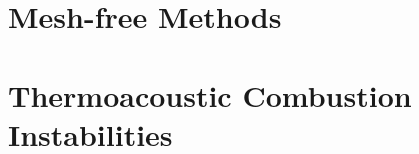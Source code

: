 \cite{thompson1987TimeDependentBoundary, thompson1990TimeDependentBoundaryConditions, poinsot1992BoundaryConditionsDirect, poinsot2005TheoreticalNumericalCombustion, sutherland2003ImprovedBoundaryConditions}

















\section{Mesh-free Methods}

\cite{monaghan1992SmoothedParticleHydrodynamics, vacondio2021GrandChallengesSmoothed}






\section{Thermoacoustic Combustion Instabilities}


